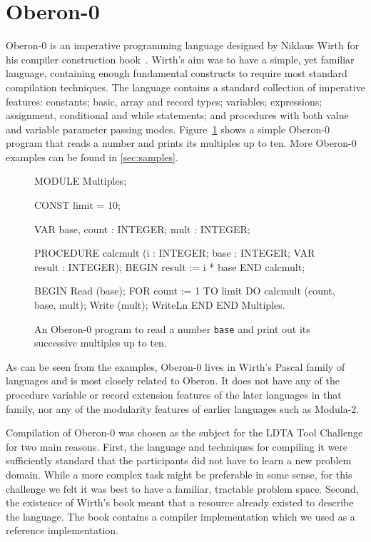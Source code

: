 \section{Oberon-0}
\label{sec:oberon}

Oberon-0 is an imperative programming language designed by Niklaus Wirth for his compiler construction book~\cite{Wirth96}.
Wirth's aim was to have a simple, yet familiar language, containing enough fundamental constructs to require most standard compilation techniques.
The language contains a standard collection of imperative features: constants; basic, array and record types; variables; expressions; assignment, conditional and while statements; and procedures with both value and variable parameter passing modes.
Figure~\ref{fig:oberonexample} shows a simple Oberon-0 program that reads a number and prints its multiples up to ten.
More Oberon-0 examples can be found in \ref{sec:samples}.

\begin{figure}[t]
\begin{oberon0}
MODULE Multiples;

CONST
  limit = 10;

VAR
  base, count : INTEGER;
  mult : INTEGER;

PROCEDURE calcmult (i : INTEGER; base : INTEGER;
                    VAR result : INTEGER);
BEGIN
  result := i * base
END calcmult;

BEGIN
  Read (base);
  FOR count := 1 TO limit DO
    calcmult (count, base, mult);
    Write (mult);
    WriteLn
  END
END Multiples.
\end{oberon0}
\caption{An Oberon-0 program to read a number \texttt{base} and print out its successive multiples up to ten.}
\label{fig:oberonexample}
\end{figure}

As can be seen from the examples, Oberon-0 lives in Wirth's Pascal family of languages and is most closely related to Oberon.
It does not have any of the procedure variable or record extension features of the later languages in that family, nor any of the modularity features of earlier languages such as Modula-2.

Compilation of Oberon-0 was chosen as the subject for the LDTA Tool Challenge for two main reasons.
First, the language and techniques for compiling it were sufficiently standard that the participants did not have to learn a new problem domain.
While a more complex task might be preferable in some sense, for this challenge we felt it was best to have a familiar, tractable problem space.
Second, the existence of Wirth's book meant that a resource already existed to describe the language.
The book contains a compiler implementation which we used as a reference implementation.


